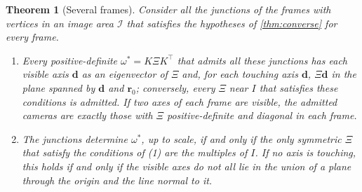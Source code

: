 \documentclass[pdflatex,sn-mathphys-num,iicol]{sn-jnl}
\newcommand{\vd}{\mathbf{d}}
\newcommand{\vr}{\mathbf{r}}
\theoremstyle{thmstyleone}
\newtheorem{theorem}{Theorem}
\theoremstyle{thmstylethree}
\theoremstyle{thmstyletwo}
\begin{document}
\begin{theorem}[Several frames]\label{thm:frames}
Consider all the junctions of the frames with vertices in an image area $\mathcal I$ that satisfies the hypotheses of \cref{thm:converse} for every frame.
\begin{enumerate}
\item Every positive-definite $\omega^{*}=K\Xi K^{\top}$ that admits all these junctions has each visible axis $\vd$ as an eigenvector of $\Xi$ and, for each touching axis $\vd$, $\Xi\vd$ in the plane spanned by $\vd$ and $\vr_0$; conversely, every $\Xi$ near $I$ that satisfies these conditions is admitted. If two axes of each frame are visible, the admitted cameras are exactly those with $\Xi$ positive-definite and diagonal in each frame.
\item The junctions determine $\omega^{*}$, up to scale, if and only if the only symmetric $\Xi$ that satisfy the conditions of (1) are the multiples of $I$. If no axis is touching, this holds if and only if the visible axes do not all lie in the union of a plane through the origin and the line normal to it.
\end{enumerate}
\end{theorem}
\end{document}
